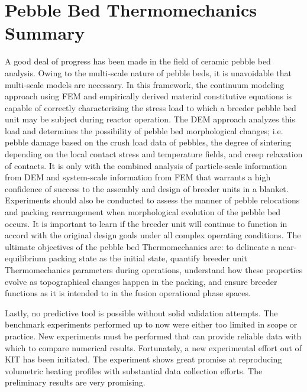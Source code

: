 \section{Pebble Bed Thermomechanics Summary}
A good deal of progress has been made in the field of ceramic pebble bed analysis. Owing to the multi-scale nature of pebble beds, it is unavoidable that multi-scale models are necessary. In this framework, the continuum modeling approach using FEM and empirically derived material constitutive equations is capable of correctly characterizing the stress load to which a breeder pebble bed unit may be subject during reactor operation. The DEM approach analyzes this load and determines the possibility of pebble bed morphological changes; i.e. pebble damage based on the crush load data of pebbles, the degree of sintering depending on the local contact stress and temperature fields, and creep relaxation of contacts. It is only with the combined analysis of particle-scale information from DEM and system-scale information from FEM that warrants a high confidence of success to the assembly and design of breeder units in a blanket.  Experiments should also be conducted to assess the manner of pebble relocations and packing rearrangement when morphological evolution of the pebble bed occurs. It is important to learn if the breeder unit will continue to function in accord with the original design goals under all complex operating conditions.  The ultimate objectives of the pebble bed Thermomechanics are: to delineate a near-equilibrium packing state as the initial state, quantify breeder unit Thermomechanics parameters during operations, understand how these properties evolve as topographical changes happen in the packing, and ensure breeder functions as it is intended to in the fusion operational phase spaces.


Lastly, no predictive tool is possible without solid validation attempts. The benchmark experiments performed up to now were either too limited in scope or practice. New experiments must be performed that can provide reliable data with which to compare numerical results. Fortunately, a new experimental effort out of KIT has been initiated.\cite{Hernandez2014} The experiment shows great promise at reproducing volumetric heating profiles with substantial data collection efforts. The preliminary results are very promising.




